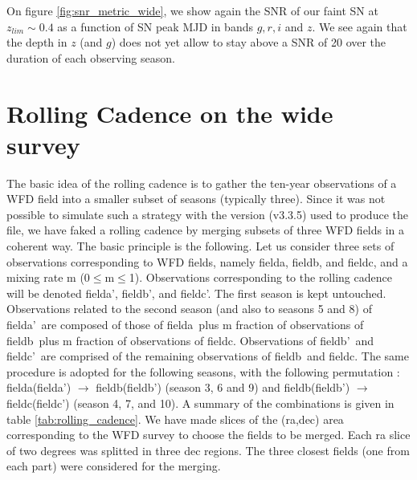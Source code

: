 \documentclass[\docopts]{\docclass}
\newcommand{\fia}{fielda}
\newcommand{\fib}{fieldb}
\newcommand{\fic}{fieldc}
\newcommand{\fiap}{fielda'}
\newcommand{\fibp}{fieldb'}
\newcommand{\ficp}{fieldc'}
\begin{document}
On figure \ref{fig:snr_metric_wide}, we show again the SNR of our
faint SN at $z_{lim} \sim 0.4$ as a function of SN peak MJD in bands
$g, r, i$ and $z$. We see again that the depth in $z$ (and $g$) does
not yet allow to stay above a SNR of 20 over the duration of each
observing season.




\section{Rolling Cadence on the wide survey}
\label{sec:rolling_cadence}

The basic idea of the rolling cadence is to gather the ten-year
observations of a WFD field into a smaller subset of seasons
(typically three). Since it was not possible to simulate such a
strategy with the  version (v3.3.5) used to produce the 
file, we have faked a rolling cadence by merging subsets of three WFD
fields in a coherent way. The basic principle is the following. Let us
consider three sets of observations corresponding to WFD fields,
namely \fia, \fib, and \fic, and a mixing rate m
(0$\leq$m$\leq$1).  Observations corresponding to the rolling cadence
will be denoted \fiap, \fibp, and \ficp. The first season is kept
untouched. Observations related to the second season (and also to
seasons 5 and 8) of \fiap~are composed
of those of \fia~plus m fraction of observations of \fib~plus m fraction
of observations of \fic. Observations of \fibp~and \ficp~are comprised of
the remaining observations of \fib~and \fic. The same procedure is
adopted for the following seasons, with the following permutation :
\fia (\fiap) $\rightarrow$ \fib (\fibp) (season 3, 6 and 9) and \fib (\fibp)
$\rightarrow$ \fic (\ficp) (season 4, 7, and 10). A summary of the combinations
is given in  table \ref{tab:rolling_cadence}. We have made slices of
the (ra,dec) area corresponding to the WFD survey to choose the fields
to be merged. Each ra slice of two degrees was splitted in three dec
regions. The three closest fields (one from each part) were considered for the
merging. 
\end{document}
